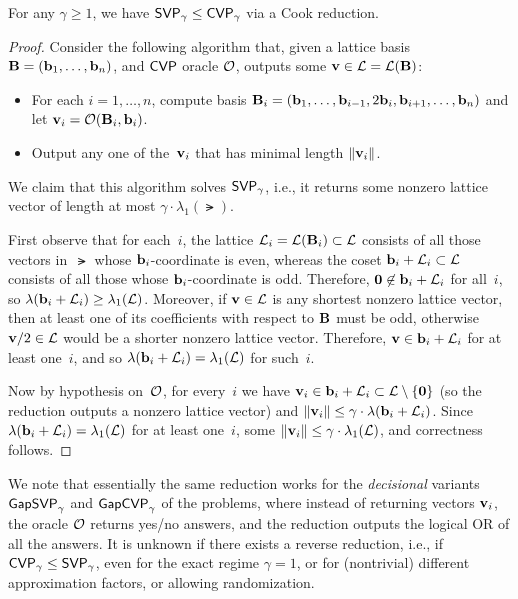 \documentclass[11pt]{article}
\begin{document}
\begin{theorem}
  For any $\gamma \geq 1$, we have $\mathsf{SVP}_{\gamma} \leq \mathsf{CVP}_{\gamma}$
  via a Cook reduction.
\end{theorem}

\begin{proof}
  Consider the following algorithm that, given a lattice basis
  $\mathbf{B}=(\mathbf{b}_1, \ldots, \mathbf{b}_n)$, and $\mathsf{CVP}$ oracle $\mathcal{O}$,
  outputs some $\mathbf{v} \in \mathcal{L} = \mathcal{L}(\mathbf{B})$:
  \begin{itemize}[itemsep=0pt]
  \item For each $i=1,\ldots, n$, compute basis
    $\mathbf{B}_i = (\mathbf{b}_1, \ldots, \mathbf{b}_{i-1}, 2\mathbf{b}_i, \mathbf{b}_{i+1},
    \ldots, \mathbf{b}_n )$ and let $\mathbf{v}_i = \mathcal{O}(\mathbf{B}_i, \mathbf{b}_i)$.
  \item Output any one of the~$\mathbf{v}_i$ that has minimal length
    $\lVert\mathbf{v}_{i}\rVert$.
  \end{itemize}
  We claim that this algorithm solves $\mathsf{SVP}_{\gamma}$, i.e., it
  returns some nonzero lattice vector of length at most
  $\gamma \cdot \lambda_{1}(\lat)$.

  First observe that for each~$i$, the lattice
  $\mathcal{L}_{i} = \mathcal{L}(\mathbf{B}_{i}) \subset \mathcal{L}$ consists of all those
  vectors in~$\lat$ whose $\mathbf{b}_{i}$-coordinate is even, whereas the
  coset $\mathbf{b}_{i} + \mathcal{L}_{i} \subset \mathcal{L}$ consists of all those
  whose $\mathbf{b}_{i}$-coordinate is odd. Therefore,
  $\mathbf{0} \not\in \mathbf{b}_{i} + \mathcal{L}_{i}$ for all~$i$, so
  $\lambda(\mathbf{b}_{i} + \mathcal{L}_{i}) \geq \lambda_{1}(\mathcal{L})$. Moreover, if
  $\mathbf{v} \in \mathcal{L}$ is any shortest nonzero lattice vector, then at
  least one of its coefficients with respect to $\mathbf{B}$ must be odd,
  otherwise $\mathbf{v}/2 \in \mathcal{L}$ would be a shorter nonzero lattice
  vector. Therefore, $\mathbf{v} \in \mathbf{b}_{i} + \mathcal{L}_{i}$ for at least
  one~$i$, and so $\lambda(\mathbf{b}_{i}+\mathcal{L}_{i}) = \lambda_{1}(\mathcal{L})$
  for such~$i$.

  Now by hypothesis on~$\mathcal{O}$, for every~$i$ we have
  $\mathbf{v}_{i} \in \mathbf{b}_{i} + \mathcal{L}_{i} \subset \mathcal{L} \setminus
  \{\mathbf{0}\}$ (so the reduction outputs a nonzero lattice vector)
  and
  $\lVert\mathbf{v}_{i}\rVert \leq \gamma \cdot \lambda(\mathbf{b}_{i} +
  \mathcal{L}_{i})$. Since
  $\lambda(\mathbf{b}_{i} + \mathcal{L}_{i}) = \lambda_{1}(\mathcal{L})$ for at least
  one~$i$, some
  $\lVert\mathbf{v}_{i}\rVert \leq \gamma \cdot \lambda_{1}(\mathcal{L})$, and
  correctness follows.
\end{proof}

We note that essentially the same reduction works for the
\emph{decisional} variants $\mathsf{GapSVP}_{\gamma}$ and $\mathsf{GapCVP}_{\gamma}$
of the problems, where instead of returning vectors $\mathbf{v}_{i}$, the
oracle $\mathcal{O}$ returns yes/no answers, and the reduction outputs the
logical OR of all the answers. It is unknown if there exists a reverse
reduction, i.e., if $\mathsf{CVP}_{\gamma} \leq \mathsf{SVP}_{\gamma}$, even for the
exact regime $\gamma=1$, or for (nontrivial) different approximation
factors, or allowing randomization.
\end{document}
